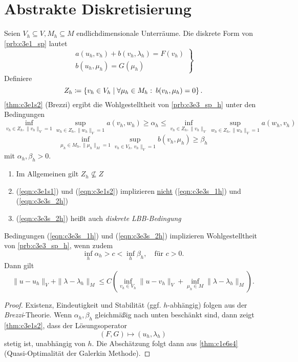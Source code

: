 \documentclass[../skript.tex]{subfiles}
\begin{document}
\section{Abstrakte Diskretisierung}\label{sec:c3e3}
Seien $V_h\subseteq V, M_h\subseteq M$ endlichdimensionale Unterräume. Die diskrete Form von \cref{prb:c3e1_sp} lautet
\begin{equation*}
	\left.
		\begin{aligned}
			a(u_h,v_h) + b(v_h,\lambda_h) = F(v_h) \\
			b(u_h,\mu_h) = G(\mu_h)
		\end{aligned}
		\right\}\tag{SPh}
		\label{prb:c3e3_sp_h}
\end{equation*}
Definiere
\[
	Z_h \coloneqq \left\{ v_h\in V_h \mathrel{}\middle|\mathrel{} \forall\mu_h\in M_h:\:b(v_h,\mu_h) = 0 \right\}.
\]
\cref{thm:c3e1s2} (Brezzi) ergibt die Wohlgestelltheit von \cref{prb:c3e3_sp_h} unter den Bedingungen
\begin{equation*}
	\inf_{v_h\in Z_h,\|v_h\|_V=1}\sup_{w_h\in Z_h,\|w_h\|_V=1} a(v_h,w_h) \geq\alpha_h\leq\inf_{v_h\in Z_h,\|v_h\|_V}\sup_{w_h\in Z_h,\|w_h\|_V=1} a(w_h,v_h)\tag{1h}\label{eqn:c3e3s_1h}  %
\end{equation*}
\begin{equation*}
	\inf_{\mu_h\in M_h,\|\mu_h\|_M=1}\sup_{v_h\in V_h,\,v_h\|_V=1} b(v_h,\mu_h) \geq\beta_h\label{eqn:c3e3s_2h}\tag{2h} %
\end{equation*}
mit $\alpha_h,\beta_h > 0$.
\begin{remark}
	\begin{enumerate}
		\item Im Allgemeinen gilt $Z_h\not\subseteq Z$
		\item (\ref{eqn:c3e1s1}) und (\ref{eqn:c3e1s2}) implizieren \underline{nicht} (\ref{eqn:c3e3s_1h}) und (\ref{eqn:c3e3s_2h})
		\item (\ref{eqn:c3e3s_2h}) heißt auch \emph{diskrete LBB-Bedingung}
	\end{enumerate}
\end{remark}

\begin{theorem}\label{thm:c3e3s2}
	Bedingungen (\ref{eqn:c3e3s_1h}) und (\ref{eqn:c3e3s_2h}) implizieren Wohlgestelltheit von \cref{prb:c3e3_sp_h}, wenn zudem 
	\[
		\inf_{h}\alpha_h > c < \inf_h\beta_h,\quad\text{für } c>0.
	\]
	Dann gilt
	\[
		\|u-u_h\|_{V} + \|\lambda-\lambda_h\|_M \leq C\left( \inf_{v_h\in V_h}\|u-v_h\|_V + \inf_{\mu_h\in M}\|\lambda-\lambda_h\|_M \right).
	\]
\end{theorem}
\begin{proof}
	Existenz, Eindeutigkeit und Stabilität (ggf. $h$-abhängig) folgen aus der \emph{Brezzi}-Theorie. Wenn $\alpha_h,\beta_h$ gleichmäßig nach unten beschänkt sind, dann zeigt \cref{thm:c3e1s2}, dass der Lösungsoperator
	\[
		(F,G)\mapsto (u_h,\lambda_h)
	\]
	stetig ist, unabhängig von $h$. Die Abschätzung folgt dann aus \cref{thm:c1e6s4} (Quasi-Optimalität der Galerkin Methode). 
\end{proof}
\end{document}
